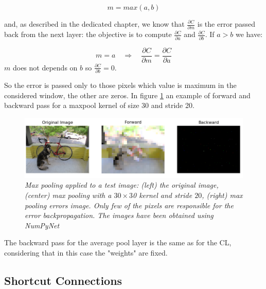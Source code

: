 \documentclass[12pt,a4paper]{report}
\begin{document}
\begin{equation}
 m = max(a, b)
\end{equation}

and, as described in the dedicated chapter, we know that $\frac{\partial C}{\partial m}$ is the error passed back from the next layer: the objective is to compute $\frac{\partial C}{\partial a}$ and $\frac{\partial C}{\partial b}$. 
If $a > b$ we have: 

\begin{equation}
 m = a \quad \Rightarrow \quad \frac{\partial C}{\partial m} = \frac{\partial C}{\partial a}
\end{equation}
$m$ does not depends on $b$ so $\frac{\partial C}{\partial b} = 0$.

So the error is passed only to those pixels which value is maximum in the considered window, the other are zeros. 
In figure \ref{fig:maxpool:ex} an example of forward and backward pass for a maxpool kernel of size 30 and stride 20.

\begin{figure}[h]
 \centering
 \includegraphics[scale=0.53]{./images/maxpool_30_20.png}
 \caption{\it Max pooling applied to a test image: (left) the original image, (center) max pooling with a $30 \times 3$0 kernel and stride $20$, (right) max pooling errors image. Only few of the pixels are responsible for the error backpropagation. 
 The images have been obtained using NumPyNet}
 \label{fig:maxpool:ex}
\end{figure}

The backward pass for the average pool layer is the same as for the CL, considering that in this case the "weights" are fixed.


\subsection*{Shortcut Connections}
\end{document}
